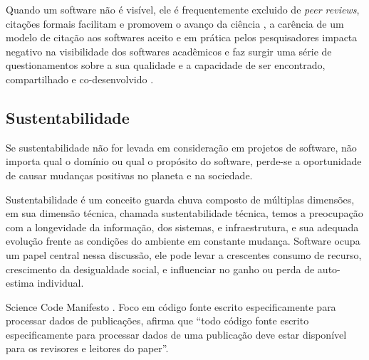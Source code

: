Quando um software não é visível, ele é frequentemente excluido de {\it peer
reviews}, citações formais facilitam e promovem o avanço da ciência \cite{allen2014credit}, a carência
de um modelo de citação aos softwares aceito e em prática pelos pesquisadores
impacta negativo na visibilidade dos softwares acadêmicos e faz surgir uma
série de questionamentos sobre a sua qualidade e a capacidade de ser
encontrado, compartilhado e co-desenvolvido \cite{howison2013,
katz2014transitive} \cite{howison2016software}.


\subsection{Sustentabilidade} \label{sustentabilidade}

Se sustentabilidade não for levada em consideração em projetos de software, não
importa qual o domínio ou qual o propósito do software, perde-se a oportunidade
de causar mudanças positivas no planeta e na sociedade.

%

Sustentabilidade é um conceito guarda chuva composto de múltiplas dimensões, em
sua dimensão técnica, chamada sustentabilidade técnica, temos a preocupação com
a longevidade da informação, dos sistemas, e infraestrutura, e sua adequada
evolução frente as condições do ambiente em constante mudança. Software ocupa
um papel central nessa discussão, ele pode levar a crescentes consumo de
recurso, crescimento da desigualdade social, e influenciar no ganho ou perda de
auto-estima individual.

Science Code Manifesto \cite{barnes2013science}.
Foco em código fonte escrito especificamente para processar dados de
publicações, afirma que ``todo código fonte escrito especificamente para
processar dados de uma publicação deve estar disponível para os revisores e
leitores do paper''.

